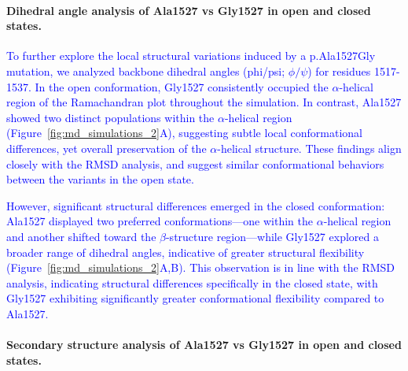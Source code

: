 \documentclass[12pt]{article}
\begin{document}
\paragraph{Dihedral angle analysis of Ala1527 vs Gly1527 in open and closed states.}
\newcommand{\quoteM}{\textcolor{blue}{To further explore the local structural variations induced by a p.Ala1527Gly mutation, we analyzed backbone dihedral angles (phi/psi; $\phi/\psi$) for residues 1517-1537. In the open conformation, Gly1527 consistently occupied the $\alpha$-helical region of the Ramachandran plot throughout the simulation. In contrast, Ala1527 showed two distinct populations within the $\alpha$-helical region (Figure~\ref{fig:md_simulations_2}A), suggesting subtle local conformational differences, yet overall preservation of the $\alpha$-helical structure. These findings align closely with the RMSD analysis, and suggest similar conformational behaviors between the variants in the open state. \label{quoteM-label}}}

\quoteM

\newcommand{\quoteN}{\textcolor{blue}{However, significant structural differences emerged in the closed conformation: Ala1527 displayed two preferred conformations—one within the $\alpha$-helical region and another shifted toward the $\beta$-structure region—while Gly1527 explored a broader range of dihedral angles, indicative of greater structural flexibility (Figure~\ref{fig:md_simulations_2}A,B). This observation is in line with the RMSD analysis, indicating structural differences specifically in the closed state, with Gly1527 exhibiting significantly greater conformational flexibility compared to Ala1527.}}

\quoteN

\paragraph{Secondary structure analysis of Ala1527 vs Gly1527 in open and closed states.}
\newcommand{\quoteO}{\textcolor{blue}{To complement backbone angle analysis, we also evaluated secondary structure stability throughout the simulation. In the open state, secondary structure content was comparable between variants, maintaining similar $\alpha$-helical character (Figure~\ref{fig:md_simulations_2}C). Upon transitioning to the closed state, both variants experienced a substantial loss of $\alpha$-helical content across residues 1517-1537. This loss, however, was more pronounced in the Gly1527 variant compared to the Ala1527 variant, as residues 1520-1525 retained partial $\alpha$-helical structure more robustly in the Ala1527 variant compared to Gly1527 (Figure~\ref{fig:md_simulations_2}C).}}
\end{document}
